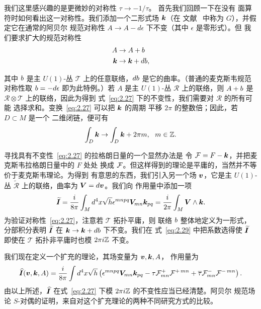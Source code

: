 我们这里感兴趣的是更微妙的对称性 $\tau\to -1/\tau$。
首先我们回顾一下在没有
面算符时如何看出这一对称性。我们添加一个二形式场 $\bm{k}$（在
文献~\cite{ref43} 中称为 $G$），并假定它在通常的阿贝尔
规范对称性 $A\to A-d\epsilon$ 下不变（其中 $\epsilon$ 是零形式）。但
我们要求扩大的规范对称性
\setcounter{equation}{26}
\begin{equation}\label{eq:2.27}
  \begin{aligned}A&\to
A+b\\
                                       \bm{k}&\to \bm{k}+db,\end{aligned}
\end{equation}

其中 $b$ 是主 $U(1)$-丛 ${\mathcal
T}$ 上的任意联络，$db$ 是它的曲率。（普通的麦克斯韦规范
对称性取 $b=-d\epsilon$ 即为此特例。）若 $A$
是主 $U(1)$-丛 ${\mathcal R}$ 上的联络，则
$A+b$ 是 ${\mathcal R}\otimes {\mathcal T}$ 上的联络，因此为得到
式~\eqref{eq:2.27} 下的不变性，我们需要对 ${\mathcal R}$ 的所有可能
选择求和。变换~\eqref{eq:2.27} 可以把 $\bm{k}$ 的周期
平移 $2\pi$ 的整数倍；因此，若 $D\subset M$ 是一个
二维闭链，便可有
\setcounter{equation}{27}
\begin{equation}\label{eq:2.28}
  \int_D\bm{k}\to\int_D\bm{k}+2\pi m,
~~m\in{\mathbb{Z}}.
\end{equation}




寻找具有不变性~\eqref{eq:2.27} 的拉格朗日量的一个显然办法是
令 ${\mathcal F}=F-\bm{k}$，并把麦克斯韦拉格朗日量中的 $F$ 处处
换成 ${\mathcal F}$。但这样得到的理论是平庸的，当然并不等价于麦克斯韦理论。为得到
有意思的东西，我们引入另一个场 $\bm{v}$，它是主
$U(1)$-丛 $\tilde{\mathcal R}$ 上的联络，曲率为 $\bm{V}=d\bm{v}$。我们向
作用量中添加一项
\setcounter{equation}{28}
\begin{equation}\label{eq:2.29}
  \widetilde {\bm{I}}={i\over 8\pi}\int_M d^4x
\sqrt h\epsilon^{mnpq}\bm{V}_{mn}\bm{k}_{pq}={i\over 2\pi}\int_M \bm{V}\wedge
\bm{k}.
\end{equation}
 为验证对称性~\eqref{eq:2.27}，注意若 ${\mathcal T}$ 拓扑平庸，则
联络 $b$ 整体地定义为一形式，分部积分表明 $\widetilde{\bm{I}}$ 在
$\bm{k}\to \bm{k}+db$ 下不变。我们在
式~\eqref{eq:2.29} 中把系数选得使 $\widetilde{\bm{I}}$ 即使在
${\mathcal T}$ 拓扑非平庸时也模 $2\pi i{\mathbb{Z}}$ 不变。

我们现在定义一个扩充的理论，其场变量为 $\bm{v},\bm{k},A$，
作用量为
\setcounter{equation}{29}
\begin{equation}\label{eq:2.30}
  \widehat{\bm{I}}(\bm{v},\bm{k},A)={i\over 8\pi}\int
d^4x\sqrt h\left(\epsilon^{mnpq}\bm{V}_{mn}\bm{k}_{pq}-\tau
{\mathcal F}^+_{mn}{\mathcal F}^{+\,mn}+\overline\tau {\mathcal F}_{mn}^-{\mathcal F}^{-\,mn}\right).
\end{equation}
 由以上所述，$\widehat{\bm{I}}$ 在式~\eqref{eq:2.27} 下模
$2\pi i{\mathbb{Z}}$ 的不变性应当已经清楚。阿贝尔
规范场论 $S$-对偶的证明，来自对这个扩充理论的两种不同研究方式的比较。

